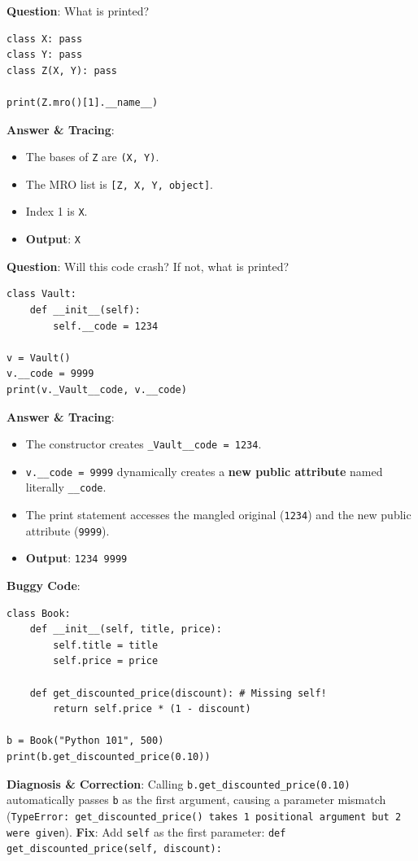 \begin{outputprediction}
\textbf{Question}: What is printed?
\begin{lstlisting}[language=Python3]
class X: pass
class Y: pass
class Z(X, Y): pass

print(Z.mro()[1].__name__)
\end{lstlisting}
\textbf{Answer \& Tracing}:
\begin{itemize}
    \item The bases of \texttt{Z} are \texttt{(X, Y)}.
    \item The MRO list is \texttt{[Z, X, Y, object]}.
    \item Index 1 is \texttt{X}.
    \item \textbf{Output}: \texttt{X}
\end{itemize}
\end{outputprediction}

\begin{outputprediction}
\textbf{Question}: Will this code crash? If not, what is printed?
\begin{lstlisting}[language=Python3]
class Vault:
    def __init__(self):
        self.__code = 1234

v = Vault()
v.__code = 9999
print(v._Vault__code, v.__code)
\end{lstlisting}
\textbf{Answer \& Tracing}:
\begin{itemize}
    \item The constructor creates \texttt{\_Vault\_\_code = 1234}.
    \item \texttt{v.\_\_code = 9999} dynamically creates a \textbf{new public attribute} named literally \texttt{\_\_code}.
    \item The print statement accesses the mangled original (\texttt{1234}) and the new public attribute (\texttt{9999}).
    \item \textbf{Output}: \texttt{1234 9999}
\end{itemize}
\end{outputprediction}


\begin{debuggingbox}
\textbf{Buggy Code}:
\begin{lstlisting}[language=Python3]
class Book:
    def __init__(self, title, price):
        self.title = title
        self.price = price
        
    def get_discounted_price(discount): # Missing self!
        return self.price * (1 - discount)

b = Book("Python 101", 500)
print(b.get_discounted_price(0.10))
\end{lstlisting}
\textbf{Diagnosis \& Correction}:
Calling \texttt{b.get\_discounted\_price(0.10)} automatically passes \texttt{b} as the first argument, causing a parameter mismatch (\texttt{TypeError: get\_discounted\_price() takes 1 positional argument but 2 were given}).
\textbf{Fix}: Add \texttt{self} as the first parameter: \texttt{def get\_discounted\_price(self, discount):}
\end{debuggingbox}

